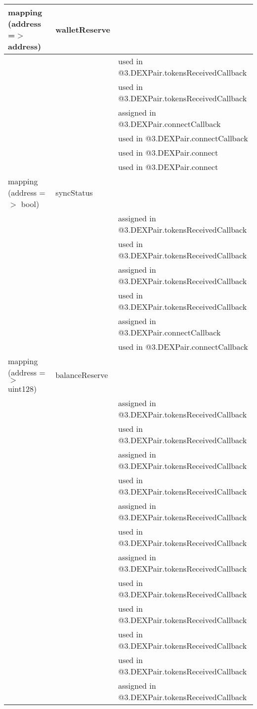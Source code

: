 \ifsoltables
\noindent\begin{tabular}{|l|l|p{5cm}|}\hline
mapping (address =$>$ address) & walletReserve &  \\\hline
 & & used in @3.DEXPair.tokensReceivedCallback\\\hline
 & & used in @3.DEXPair.tokensReceivedCallback\\\hline
 & & assigned in @3.DEXPair.connectCallback\\\hline
 & & used in @3.DEXPair.connectCallback\\\hline
 & & used in @3.DEXPair.connect\\\hline
 & & used in @3.DEXPair.connect\\\hline
mapping (address =$>$ bool) & syncStatus &  \\\hline
 & & assigned in @3.DEXPair.tokensReceivedCallback\\\hline
 & & used in @3.DEXPair.tokensReceivedCallback\\\hline
 & & assigned in @3.DEXPair.tokensReceivedCallback\\\hline
 & & used in @3.DEXPair.tokensReceivedCallback\\\hline
 & & assigned in @3.DEXPair.connectCallback\\\hline
 & & used in @3.DEXPair.connectCallback\\\hline
mapping (address =$>$ uint128) & balanceReserve &  \\\hline
 & & assigned in @3.DEXPair.tokensReceivedCallback\\\hline
 & & used in @3.DEXPair.tokensReceivedCallback\\\hline
 & & assigned in @3.DEXPair.tokensReceivedCallback\\\hline
 & & used in @3.DEXPair.tokensReceivedCallback\\\hline
 & & assigned in @3.DEXPair.tokensReceivedCallback\\\hline
 & & used in @3.DEXPair.tokensReceivedCallback\\\hline
 & & assigned in @3.DEXPair.tokensReceivedCallback\\\hline
 & & used in @3.DEXPair.tokensReceivedCallback\\\hline
 & & used in @3.DEXPair.tokensReceivedCallback\\\hline
 & & used in @3.DEXPair.tokensReceivedCallback\\\hline
 & & used in @3.DEXPair.tokensReceivedCallback\\\hline
 & & assigned in @3.DEXPair.tokensReceivedCallback\\\hline

\end{tabular}
